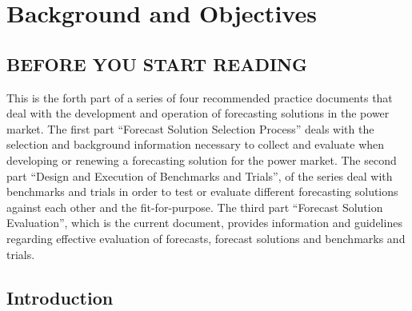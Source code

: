 \chapter{Background and Objectives {\color{magenta}{Contributing author: COM, JY}}} \label{ch:introduction}

\noindent
\begin{comment}
\begin{tcolorbox}
\parbox{\textwidth}{
\emph{\textbf{Key Points}\\
This is the fourth part of a series of four recommended practice documents that deals with the development and operation of renewable energy forecasting solutions for the power market.
This part provides information and guidelines for the best practices of met measurements in the real-time operation of grid operators....
}}
\end{tcolorbox}
\end{comment}


\section{BEFORE YOU START READING}

This is the forth part of a series of four recommended practice documents that deal with the development and operation of forecasting solutions in the power market. 
The first part  “Forecast Solution Selection Process” deals with the selection and background information necessary to collect and evaluate when developing or renewing a forecasting solution for the power market. 
The second part “Design and Execution of Benchmarks and Trials”, of the series deal with benchmarks and trials in order to test or evaluate different forecasting solutions against each other and the fit-for-purpose. 
The third part “Forecast Solution Evaluation”, which is the current document, provides information and guidelines regarding effective evaluation of forecasts, forecast solutions and benchmarks and trials.


\section{Introduction {\color{magenta}{Contributing author: COM}}}

